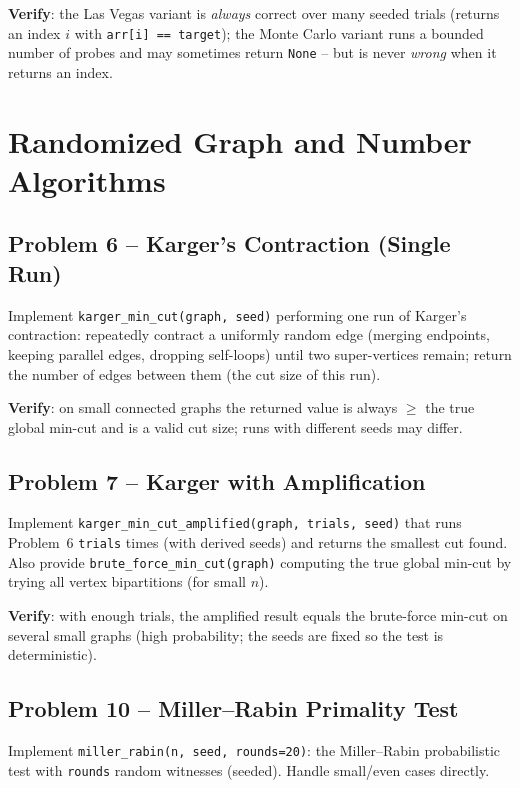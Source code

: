 \documentclass[11pt]{article}
\begin{document}
\textbf{Verify}: the Las Vegas variant is \emph{always} correct over many seeded trials
(returns an index $i$ with \texttt{arr[i] == target}); the Monte Carlo variant runs a
bounded number of probes and may sometimes return \texttt{None} -- but is never \emph{wrong}
when it returns an index.

\newpage
\section{Randomized Graph and Number Algorithms}

\subsection*{Problem 6 -- Karger's Contraction (Single Run)}

Implement \texttt{karger\_min\_cut(graph, seed)} performing one run of Karger's contraction:
repeatedly contract a uniformly random edge (merging endpoints, keeping parallel edges,
dropping self-loops) until two super-vertices remain; return the number of edges between
them (the cut size of this run).

\textbf{Verify}: on small connected graphs the returned value is always $\ge$ the true
global min-cut and is a valid cut size; runs with different seeds may differ.

\subsection*{Problem 7 -- Karger with Amplification}

Implement \texttt{karger\_min\_cut\_amplified(graph, trials, seed)} that runs Problem~6
\texttt{trials} times (with derived seeds) and returns the smallest cut found. Also provide
\texttt{brute\_force\_min\_cut(graph)} computing the true global min-cut by trying all
vertex bipartitions (for small $n$).

\textbf{Verify}: with enough trials, the amplified result equals the brute-force min-cut on
several small graphs (high probability; the seeds are fixed so the test is deterministic).

\subsection*{Problem 10 -- Miller--Rabin Primality Test}

Implement \texttt{miller\_rabin(n, seed, rounds=20)}: the Miller--Rabin probabilistic test
with \texttt{rounds} random witnesses (seeded). Handle small/even cases directly.
\end{document}

